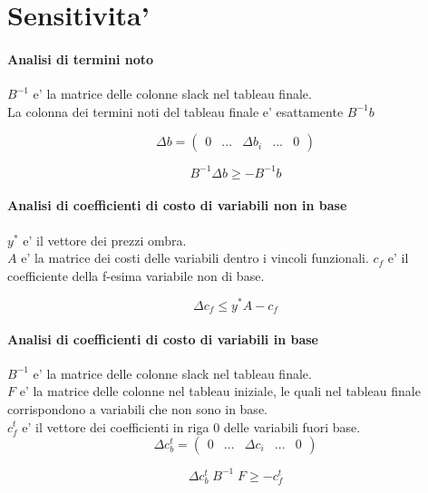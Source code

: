 \section{Sensitivita'}

\paragraph{Analisi di termini noto}

$B^{-1}$ e' la matrice delle colonne slack nel tableau finale. \\
La colonna dei termini noti del tableau finale e' esattamente $B^{-1} b$

\[
    \Delta b =
    \begin{pmatrix}
        0 & ... & \Delta b_i & ... & 0
    \end{pmatrix}
\]

\[
    B^{-1} \Delta b \geq - B^{-1} b
\]

\paragraph{Analisi di coefficienti di costo di variabili non in base}

$y^{*}$ e' il vettore dei prezzi ombra. \\
$A$ e' la matrice dei costi delle variabili dentro i vincoli funzionali.
$c_f$ e' il coefficiente della f-esima variabile non di base.

\[
    \Delta c_f \leq y^{*} A - c_f
\]

\paragraph{Analisi di coefficienti di costo di variabili in base}

$B^{-1}$ e' la matrice delle colonne slack nel tableau finale. \\
$F$ e' la matrice delle colonne nel tableau iniziale, le quali nel tableau finale corrispondono a variabili che non sono in base. \\
$c^t_f$ e' il vettore dei coefficienti in riga 0 delle variabili fuori base. \\

\[
    \Delta c^t_b =
    \begin{pmatrix}
        0 & ... & \Delta c_i & ... & 0
    \end{pmatrix}
\]


\[
    \Delta c^t_b \; B^{-1} \; F \geq - c^t_f
\]
